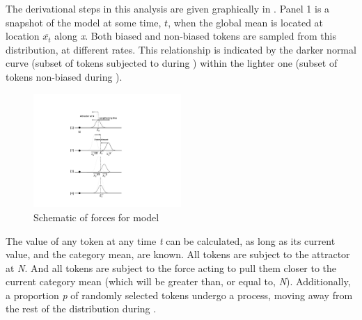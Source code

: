 The derivational steps in this analysis are given graphically in .
Panel 1 is a snapshot of the model at some
time, \emph{$t$}, when the global mean is located at location $\overline{x_{t}}$
along \emph{x}. Both biased and non-biased tokens are sampled from
this distribution, at different rates. This relationship is indicated
by the darker normal curve (subset of tokens subjected to  during
) within the lighter one (subset of tokens non-biased during
). 

\begin{figure}[h]
\includegraphics[width=0.50\textwidth]{figures/Model1Behavior.pdf}\caption{\label{fig:Derivation}Schematic of forces for  model}
\end{figure}

The  value of any token at any time \emph{t} can be calculated,
as long as its current value, and the category mean, are known. All
tokens are subject to the attractor at \emph{N}. And all tokens are
subject to the  force acting to pull them closer to the
current category mean (which will be greater than, or equal to, \emph{N}).
Additionally, a proportion \emph{p} of randomly selected tokens undergo
a  process, moving away from the rest of the distribution
during .

